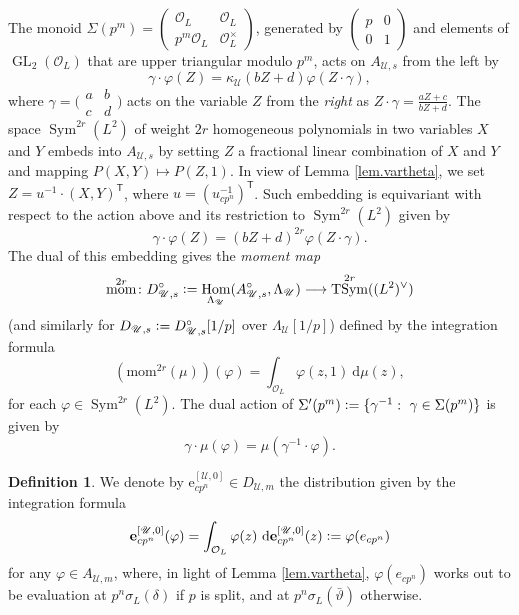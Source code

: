 \documentclass[a4paper]{amsart}
\numberwithin{equation}{section}
\theoremstyle{definition}
\newtheorem{definition}[theorem]{Definition}
\newcommand{\defeq}{\vcentcolon=}
\DeclareMathOperator{\Hom}{Hom}
\DeclareMathOperator{\GL}{GL}
\DeclareMathOperator{\TSym}{TSym}
\DeclareMathOperator{\Sym}{Sym}
\DeclareMathOperator{\mom}{mom}
\newcommand{\smallmat}[4]{\bigl(\begin{smallmatrix}#1&#2\\#3&#4\end{smallmatrix}\bigr)}
\begin{document}
The monoid $\Sigma(p^m)=\begin{pmatrix}\mathcal{O}_L & \mathcal{O}_L \\ p^m\mathcal{O}_L & \mathcal{O}_L^\times\end{pmatrix}$, generated by $\begin{pmatrix}p & 0 \\ 0 & 1\end{pmatrix}$ and elements of $\GL_2(\mathcal{O}_L)$ that are upper triangular modulo $p^m$, acts on $A_{\mathscr{U},s}$ from the left by \[\gamma\cdot \varphi(Z)=\kappa_\mathscr{U}(bZ+d)\varphi(Z\cdot \gamma),\] where $\gamma=\smallmat abcd$ acts on the variable $Z$ from the \textit{right} as $Z\cdot\gamma=\frac{aZ+c}{bZ+d}$. The space $\Sym^{2r}(L^2)$ of weight $2r$ homogeneous polynomials in two variables $X$ and $Y$ embeds into $A_{\mathscr{U},s}$ by setting $Z$ a fractional linear combination of $X$ and $Y$ and mapping $P(X,Y)\mapsto P(Z,1)$. In view of Lemma \ref{lem.vartheta}, we set $Z=u^{-1}\cdot(X,Y)^\mathsf{T}$, where $u=(u_{cp^n}^{-1})^\mathsf{T}$. Such embedding is equivariant with respect to the action above and its restriction to $\Sym^{2r}(L^2)$ given by \[\gamma\cdot \varphi(Z)=(bZ+d)^{2r}\varphi(Z\cdot \gamma).\] The dual of this embedding gives the \textit{moment map} 
\[\mom^{2r}\colon D_{\mathscr{U},s}^\circ\defeq\Hom_{\Lambda_{\mathscr{U}}}(A_{\mathscr{U},s}^\circ,\Lambda_\mathscr{U})\longrightarrow \TSym^{2r}((L^2)^\vee)\] (and similarly for $D_{\mathscr{U},s}\defeq D_{\mathscr{U},s}^\circ[1/p]$ over $\Lambda_\mathscr{U}[1/p]$) defined by the integration formula 
\begin{equation}
\left(\mathrm{mom}^{2r}(\mu)\right)(\varphi)=\int_{\mathcal{O}_L}\varphi(z,1)\ \mathrm{d}\mu(z),
\end{equation}
for each $\varphi\in\Sym^{2r}(L^2)$. The dual action of  $\Sigma'(p^m)\defeq \{\gamma^{-1}:\ \gamma\in\Sigma(p^m)\}$ is given by \[\gamma\cdot\mu(\varphi)=\mu(\gamma^{-1}\cdot\varphi).\]

\begin{definition}
We denote by $\boldsymbol{\mathrm{e}}_{cp^n}^{[\mathscr{U},0]}\in D_{\mathscr{U},m}$ the distribution given by the integration formula 
\[\boldsymbol{\mathrm{e}}_{cp^n}^{[\mathscr{U},0]}(\varphi)=\int_{\mathcal{O}_L}\varphi(z)\ \mathrm{d}\mathbf{e}_{cp^n}^{[\mathscr{U},0]}(z)\defeq\varphi(e_{cp^n})\] for any $\varphi\in A_{\mathscr{U},m}$, where, in light of Lemma \ref{lem.vartheta}, $\varphi(e_{cp^n})$ works out to be evaluation at $p^n\sigma_L(\delta)$ if $p$ is split, and at $p^n\sigma_L(\bar\vartheta)$ otherwise.
\end{definition}
\end{document}
